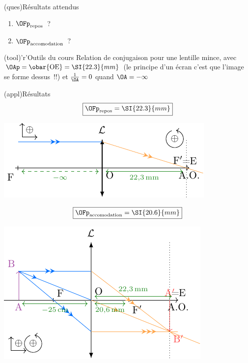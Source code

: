 \documentclass[../../main/main.tex]{subfiles}
\begin{document}
{	\begin{tcbraster}[raster columns=3, raster equal height=rows]
		\begin{tcb}(ques){Résultats attendus}
			\begin{enumerate}
				\item $\OFp _\mathrm{repos}$~?
				\item $\OFp _\mathrm{accomodation}$~?
			\end{enumerate}
		\end{tcb}
		\begin{tcb}[raster multicolumn=2](tool)'r'{Outils du cours}
			Relation de conjugaison pour une lentille mince, avec $\OAp = \obar{\rm
					OE} = \SI{22.3}{mm}$ (le principe d'un écran c'est que l'image se forme
			dessus~!!) et $\frac{1}{\OA} = 0$ quand $\OA = -\infty$
		\end{tcb}
	\end{tcbraster}

	\begin{tcb}(appl){Résultats}
		\[ \boxed{\OFp_\mathrm{repos} = \SI{22.3}{mm}}\]
		\begin{center}
			\includegraphics[width=\linewidth]{oeil_repos}
		\end{center}
		\tcblower
		\[ \boxed{\OFp_\mathrm{accomodation} = \SI{20.6}{mm}} \]
		\begin{center}
			\includegraphics[width=\linewidth]{oeil_acco}
		\end{center}
	\end{tcb}
}
\end{document}
